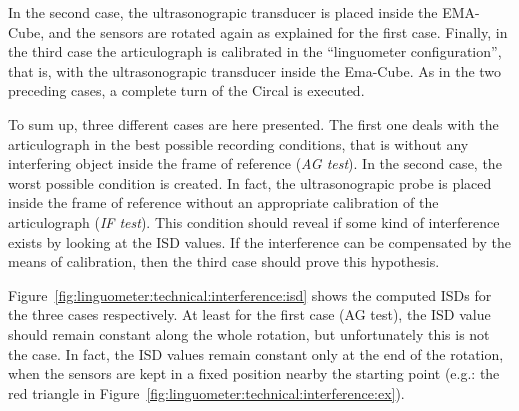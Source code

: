 
In the second case, the ultrasonograpic transducer is placed inside the
EMA-Cube, and the sensors are rotated again as explained for the first case.
Finally, in the third case the articulograph is calibrated in the ``linguometer
configuration'', that is, with the ultrasonograpic transducer inside the
Ema-Cube.
As in the two preceding cases, a complete turn of the Circal is executed.

To sum up, three different cases are here presented. 
The first one deals with the articulograph in the best possible recording
conditions, that is without any interfering object inside the frame of 
reference (\emph{AG test}).
In the second case, the worst possible condition is created. In fact, the
ultrasonograpic probe is placed inside the frame of reference without an
appropriate calibration of the articulograph (\emph{IF test}).
This condition should reveal if some kind of interference exists by looking at
the ISD values.
If the interference can be compensated by the means of calibration, then the
third case should prove this hypothesis.

Figure~\ref{fig:linguometer:technical:interference:isd} shows the computed
ISDs for the three cases respectively.
At least for the first case (AG test), the ISD value should remain constant
along the whole rotation, but unfortunately this is not the case.
In fact, the ISD values remain constant only at the end of the rotation, when
the sensors are kept in a fixed position nearby the starting point
(e.g.: the red triangle in 
Figure~\ref{fig:linguometer:technical:interference:ex}).

\pagebreak
